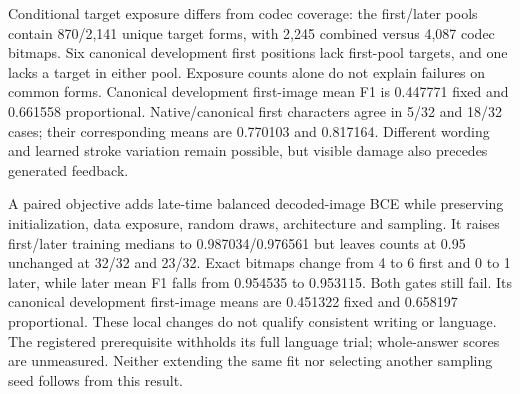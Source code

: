 \documentclass[12pt,a4paper]{article}
\providecommand{\DIFadd}[1]{{\protect\color{blue} \sf #1}} %
\begin{document}
\DIFadd{Conditional target exposure differs from codec coverage: the first/later
pools contain 870/2,141 unique target forms, with 2,245 combined versus 4,087
codec bitmaps. Six canonical development first positions lack first-pool
targets, and one lacks a target in either pool. Exposure counts alone do not
explain failures on common forms. Canonical development first-image mean F1
is 0.447771 fixed and 0.661558 proportional. Native/canonical first characters
agree in 5/32 and 18/32 cases; their corresponding means are 0.770103 and
0.817164. Different wording and learned stroke variation remain possible,
but visible damage also precedes generated feedback.
}

\DIFadd{A paired objective adds late-time balanced decoded-image BCE while preserving
initialization, data exposure, random draws, architecture and sampling. It
raises first/later training medians to 0.987034/0.976561 but leaves counts at
0.95 unchanged at 32/32 and 23/32. Exact bitmaps change from 4 to 6 first
and 0 to 1 later, while later mean F1 falls from 0.954535 to 0.953115.
Both gates still fail. Its canonical development first-image means are
0.451322 fixed and 0.658197 proportional. These local changes do not qualify
consistent writing or language. The registered prerequisite withholds its
full language trial; whole-answer scores are unmeasured. Neither extending
the same fit nor selecting another sampling seed follows from this result.
}

\end{document}
